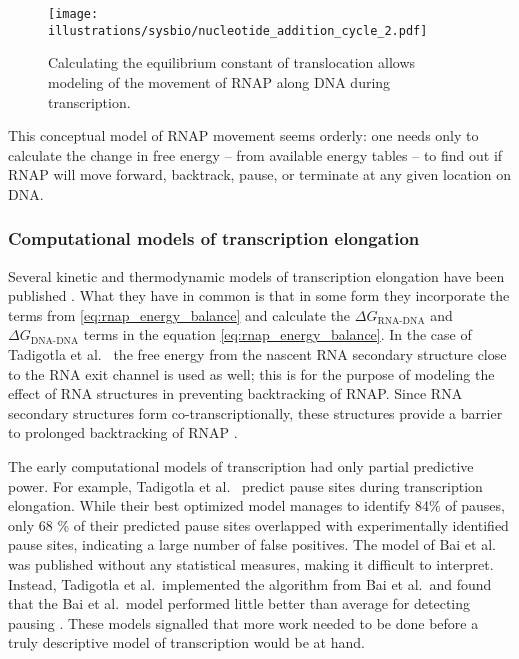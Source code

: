 \begin{figure}[htb]
	\begin{center}
		\texttt{[image: illustrations/sysbio/nucleotide\_addition\_cycle\_2.pdf]}
	\end{center}
	\caption{Calculating the equilibrium constant of translocation allows
	modeling of the movement of RNAP along DNA during transcription.}
	\label{fig:nac_2}
\end{figure}

This conceptual model of RNAP movement seems orderly: one needs only to
calculate the change in free energy -- from available energy tables
\cite{wu_temperature_2002, santalucia_thermodynamics_2004} -- to find out if
RNAP will move forward, backtrack, pause, or terminate at any given location on
DNA.

\subsubsection{Computational models of transcription elongation}
Several kinetic and thermodynamic models of transcription elongation have been
published \cite{tadigotla_thermodynamic_2006, bai_sequence-dependent_2004,
guajardo_model_1997, yager_thermodynamic_1991}. What they have in common is
that in some form they incorporate the terms from
\eqref{eq:rnap_energy_balance} and calculate the $\Delta G_{\text{RNA-DNA}}$
and $\Delta G_{\text{DNA-DNA}}$ terms in the equation
\eqref{eq:rnap_energy_balance}. In the case of Tadigotla et al.\
\cite{tadigotla_thermodynamic_2006} the free energy from the nascent RNA
secondary structure close to the RNA exit channel is used as well; this is for
the purpose of modeling the effect of RNA structures in preventing backtracking
of RNAP. Since RNA secondary structures form co-transcriptionally, these
structures provide a barrier to prolonged backtracking of RNAP
\cite{zamft_nascent_2012}.

The early computational models of transcription had only partial predictive
power. For example, Tadigotla et al.\ \cite{tadigotla_thermodynamic_2006}
predict pause sites during transcription elongation. While their best optimized
model manages to identify 84\% of pauses, only 68 \% of their predicted pause
sites overlapped with experimentally identified pause sites, indicating a large
number of false positives. The model of Bai et al.\
\cite{bai_mechanochemical_2007} was published without any statistical measures,
making it difficult to interpret. Instead, Tadigotla et al.\ implemented the
algorithm from Bai et al.\ and found that the Bai et al.\ model performed
little better than average for detecting pausing
\cite{tadigotla_thermodynamic_2006}. These models signalled that more work
needed to be done before a truly descriptive model of transcription would be at
hand.

